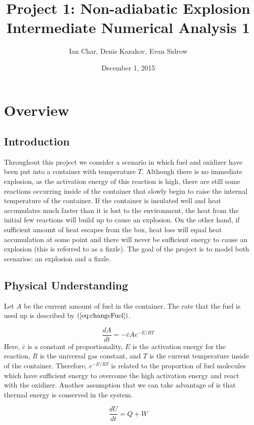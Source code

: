 \documentclass[12pt]{article}\pagestyle{myheadings}
\title{Project 1: Non-adiabatic Explosion \\ Intermediate Numerical Analysis 1}
\author{Ian Char, Denis Kazakov, Evan Sidrow}
\date{December 1, 2015}
\theoremstyle{plain}
\begin{document}
\maketitle
\section{Overview}

\subsection{Introduction}
Throughout this project we consider a scenario in which fuel and oxidizer have been put into a container with temperature $T$. Although there is no immediate explosion, as the activation energy of this reaction is high, there are still some reactions occurring inside of the container that slowly begin to raise the internal temperature of the container. If the container is insulated well and heat accumulates much faster than it is lost to the environment, the heat from the initial few reactions will build up to cause an explosion. On the other hand, if sufficient amount of heat escapes from the box, heat loss will equal heat accumulation at some point and there will never be sufficient energy to cause an explosion (this is referred to as a fizzle). The goal of the project is to model both scenarios: an explosion and a fizzle.

\subsection{Physical Understanding}
Let $A$ be the current amount of fuel in the container. The rate that the fuel is used up is described by $(\ref{eq:changeFuel})$.

\begin{equation}\label{eq:changeFuel}
\frac{dA}{dt} = -\bar{c} A e^{-E/RT}
\end{equation}
Here, $\bar{c}$ is a constant of proportionality, $E$ is the activation energy for the reaction, $R$ is the universal gas constant, and $T$ is the current temperature inside of the container. Therefore, $e^{-E/RT}$ is related to the proportion of fuel molecules which have sufficient energy to overcome the high activation energy and react with the oxidizer. Another assumption that we can take advantage of is that thermal energy is conserved in the system. 

\begin{equation}\label{eq:consEnergy}
\frac{dU}{dt} = Q + W
\end{equation}
\end{document}
